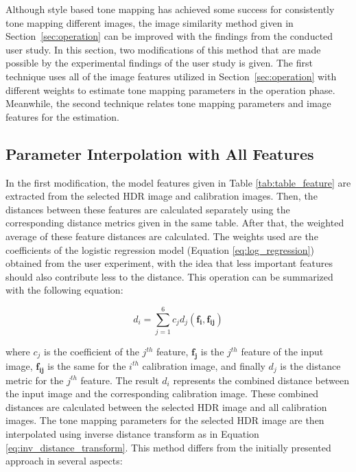 Although style based tone mapping has achieved some success for consistently tone mapping different images, the image similarity method given in Section~\ref{sec:operation} can be improved with the findings from the conducted user study. In this section, two modifications of this method that are made possible by the experimental findings of the user study is given. The first technique uses all of the image features utilized in Section~\ref{sec:operation} with different weights to estimate tone mapping parameters in the operation phase. Meanwhile, the second technique relates tone mapping parameters and image features for the estimation.

\subsection{Parameter Interpolation with All Features}
\label{sec:all_features}

In the first modification, the model features given in Table \ref{tab:table_feature} are extracted from the selected HDR image and calibration images. Then, the distances between these features are calculated separately using the corresponding distance metrics given in the same table. After that, the weighted average of these feature distances are calculated. The weights used are the coefficients of the logistic regression model (Equation \ref{eq:log_regression}) obtained from the user experiment, with the idea that less important features should also contribute less to the distance. This operation can be summarized with the following equation:

\begin{equation}
    d_i = \sum_{j=1}^{6}c_j d_j(\mathbf{f_i}, \mathbf{f_{ij}})
\end{equation}

where $c_j$ is the coefficient of the $j^{th}$ feature, $\mathbf{f_j}$ is the $j^{th}$ feature of the input image, $\mathbf{f_{ij}}$ is the same for the $i^{th}$ calibration image, and finally $d_j$ is the distance metric for the $j^{th}$ feature. The result $d_i$ represents the combined distance between the input image and the corresponding calibration image. These combined distances are calculated between the selected HDR image and all calibration images. The tone mapping parameters for the selected HDR image are then interpolated using inverse distance transform as in Equation \ref{eq:inv_distance_transform}. This method differs from the initially presented approach in several aspects: 

